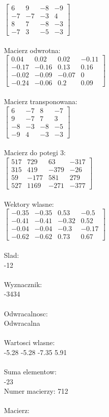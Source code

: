 \documentclass[a4paper,12pt]{article}
\begin{document}
$\begin{bmatrix} 6&9&-8&-9\\-7&-7&-3&4\\8&7&-8&-3\\-7&3&-5&-3 \end{bmatrix}$
\\
\\
Macierz odwrotna:\\

$\begin{bmatrix} 0.04&0.02&0.02&-0.11\\-0.17&-0.16&0.13&0.16\\-0.02&-0.09&-0.07&0\\-0.24&-0.06&0.2&0.09 \end{bmatrix}$
\\
\\
Macierz transponowana:\\

$\begin{bmatrix} 6&-7&8&-7\\9&-7&7&3\\-8&-3&-8&-5\\-9&4&-3&-3 \end{bmatrix}$
\\
\\
Macierz do potegi 3:\\

$\begin{bmatrix} 517&729&63&-317\\315&419&-379&-26\\59&-177&581&279\\527&1169&-271&-377 \end{bmatrix}$
\\
\\
Wektory wlasne:\\

$\begin{bmatrix} -0.35&-0.35&0.53&-0.5\\-0.41&-0.41&-0.32&0.52\\-0.04&-0.04&-0.3&-0.17\\-0.62&-0.62&0.73&0.67 \end{bmatrix}$
\\
\\
Slad:\\
-12
\\
\\
Wyznacznik:\\
-3434
\\
\\
Odwracalnosc:\\
Odwracalna
\\
\\
Wartosci wlasne:\\
-5.28 -5.28 -7.35 5.91
\\
\\
Suma elementow:\\
-23
\\
\newpage
Numer macierzy:
712
\\
\\
Macierz:\\
\end{document}
